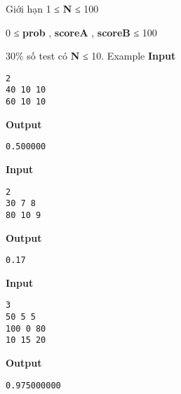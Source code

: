 Giới hạn
1 ≤ \textbf{ N } ≤ 100

0 ≤ \textbf{ prob } , \textbf{ scoreA } , \textbf{ scoreB } ≤ 100

30\% số test có \textbf{ N } ≤ 10.
Example
\textbf{Input }
\begin{verbatim}
2
40 10 10
60 10 10\end{verbatim}

\textbf{Output }
\begin{verbatim}
0.500000\end{verbatim}

\textbf{Input }
\begin{verbatim}
2
30 7 8
80 10 9\end{verbatim}

\textbf{Output }
\begin{verbatim}
0.17\end{verbatim}

\textbf{Input }
\begin{verbatim}
3
50 5 5
100 0 80
10 15 20\end{verbatim}

\textbf{Output }
\begin{verbatim}
0.975000000\end{verbatim}
